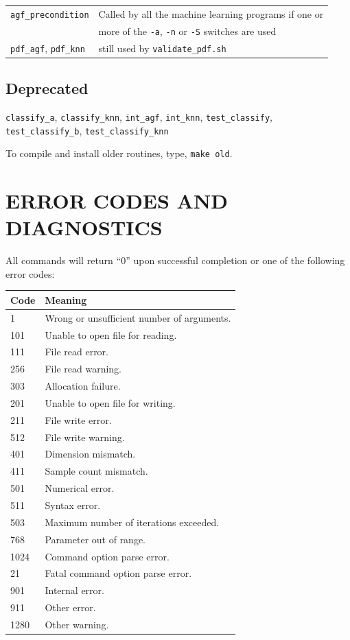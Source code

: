 \documentclass[12pt]{article}
\begin{document}
\begin{tabular}{ll}
  \verb/agf_precondition/ & Called by all the machine learning programs if one or\\
			  & more of the \verb"-a", \verb"-n" or \verb"-S" switches are used\\
  \verb/pdf_agf/, \verb/pdf_knn/ & still used by \verb/validate_pdf.sh/
\end{tabular}

\subsection{Deprecated}

  \verb/classify_a/, \verb/classify_knn/, \verb/int_agf/, \verb/int_knn/, \verb/test_classify/, \verb/test_classify_b/, \verb/test_classify_knn/

To compile and install older routines, type, \verb"make old".


\section{ERROR CODES AND DIAGNOSTICS}

  All commands will return ``0'' upon successful completion or one of the following error codes:

\begin{tabular}{ll}
Code & Meaning\\
\hline
  1	&	Wrong or unsufficient number of arguments.\\
101	&	Unable to open file for reading.\\
111	&	File read error.\\
256	&	File read warning.\\
303	&	Allocation failure.\\
201	&	Unable to open file for writing.\\
211	&	File write error.\\
512	&	File write warning.\\
401	&	Dimension mismatch.\\
411	&	Sample count mismatch.\\
501	&	Numerical error.\\
511	&	Syntax error.\\
503	&	Maximum number of iterations exceeded.\\
768	&	Parameter out of range.\\
1024	&	Command option parse error.\\
 21	&	Fatal command option parse error.\\
901	&	Internal error.\\
911	&	Other error.\\
1280	&	Other warning.
\end{tabular}
\end{document}
